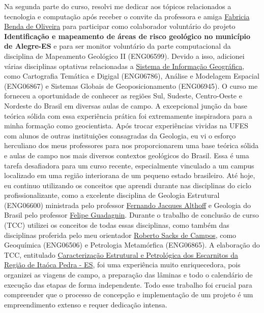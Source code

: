 \documentclass[10pt,a4paper,oneside]{book}
\begin{document}
Na segunda parte do curso, resolvi me dedicar aos tópicos relacionados a tecnologia e computação após receber o convite da professora e amiga \href{http://lattes.cnpq.br/9513837515797451}{Fabricia Benda de Oliveira} para participar como colaborador voluntário do projeto \textbf{Identificação e mapeamento de áreas de risco geológico no município de Alegre-ES} e para ser monitor voluntário da parte computacional da disciplina de Mapeamento Geológico II (ENG06599). Devido a isso, adicionei várias disciplinas optativas relacionadas a \href{https://www.gov.br/economia/pt-br/assuntos/patrimonio-da-uniao/arquivos-anteriores-privados/programa-de-modernizacao/linha-do-tempo/34-sig-apostila.pdf}{Sistema de Informação Geográfica}, como Cartografia Temática e Digigal (ENG06786), Análise e Modelagem Espacial  (ENG06867) e Sistemas Globais de Geoposicionamento (ENG06945). O curso me forneceu a oportunidade de conhecer as regiões Sul, Sudeste, Centro-Oeste e Nordeste do Brasil em diversas aulas de campo. A excepcional junção da base teórica sólida com essa experiência prática foi extremamente inspiradora para a minha formação como geocientista. Após trocar experiências vividas na UFES com alunos de outras instituições consagradas da Geologia, eu vi o esforço herculiano dos meus professores para nos proporcionarem uma base teórica sólida e aulas de campo nos  mais diversos contextos geológicos do Brasil. Essa é uma tarefa desafiadora para um curso recente, especialmente vinculado a um campus localizado em uma região interiorana de um pequeno estado brasileiro. Até hoje, eu continuo utilizando os conceitos que aprendi durante nas disciplinas do ciclo profissionalizante, como a excelente disciplina de Geologia Estrutural (ENG06600) ministrada pelo professor \href{http://lattes.cnpq.br/1004206862799097}{Fernando Jacques Althoff} e Geologia do Brasil pelo professor \href{http://lattes.cnpq.br/5883057974133630}{Felipe Guadagnin}. Durante o trabalho de conclusão de curso (TCC) utilizei os conceitos de todas essas disciplinas, como também das disciplinas proferida pelo meu orientador \href{http://lattes.cnpq.br/5081674111092263}{Roberto Sacks de Campos}, como Geoquímica (ENG06506) e Petrologia Metamórfica (ENG06865). A elaboração do TCC, entitulado \href{https://doi.org/10.6084/m9.figshare.25366483.v1}{Caracterização Estrutural e Petrológica dos Escarnitos da Região de Itaóca Pedra - ES}, foi uma experiência muito enriquecedora, pois organizei as viagens de campo, a preparação das lâminas e todo o calendário de execução das etapas de forma independente. Todo esse trabalho foi crucial para compreender que o processo de concepção e implementação de um projeto é um empreendimento extenso e requer dedicação intensa.
\end{document}
